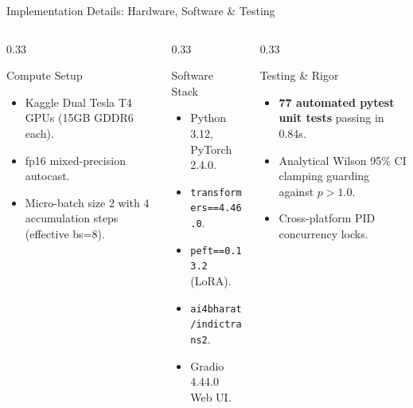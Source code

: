 \documentclass[aspectratio=169,10pt]{beamer}
\begin{document}
\begin{frame}{Implementation Details: Hardware, Software & Testing}
  \begin{columns}[T]
    \begin{column}{0.33\textwidth}
      \begin{block}{Compute Setup}
        \scriptsize
        \begin{itemize}
          \item Kaggle Dual Tesla T4 GPUs (15GB GDDR6 each).
          \item fp16 mixed-precision autocast.
          \item Micro-batch size 2 with 4 accumulation steps (effective bs=8).
        \end{itemize}
      \end{block}
    \end{column}
    \begin{column}{0.33\textwidth}
      \begin{block}{Software Stack}
        \scriptsize
        \begin{itemize}
          \item Python 3.12, PyTorch 2.4.0.
          \item \texttt{transformers==4.46.0}.
          \item \texttt{peft==0.13.2} (LoRA).
          \item \texttt{ai4bharat/indictrans2}.
          \item Gradio 4.44.0 Web UI.
        \end{itemize}
      \end{block}
    \end{column}
    \begin{column}{0.33\textwidth}
      \begin{block}{Testing & Rigor}
        \scriptsize
        \begin{itemize}
          \item \textbf{77 automated pytest unit tests} passing in 0.84s.
          \item Analytical Wilson 95\% CI clamping guarding against $p > 1.0$.
          \item Cross-platform PID concurrency locks.
        \end{itemize}
      \end{block}
    \end{column}
  \end{columns}
\end{frame}
\end{document}
